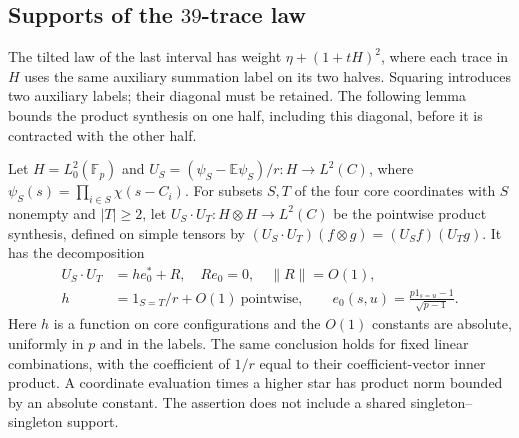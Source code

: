 \subsection{Supports of the \texorpdfstring{$39$}{39}-trace law}

The tilted law of the last interval has weight
$\eta+(1+tH)^2$, where each trace in $H$ uses the same auxiliary
summation label on its two halves. Squaring introduces two auxiliary
labels; their diagonal must be retained. The following lemma
bounds the product synthesis on one half, including this diagonal,
before it is contracted with the other half.
\begin{lemma}
\label{imp:local:star-product}
Let $H=L^2_0(\mathbb F_p)$ and
$U_S=(\psi_S-\mathbb E\psi_S)/r:H\to L^2(C)$, where
$\psi_S(s)=\prod_{i\in S}\chi(s-C_i)$.
For subsets $S,T$ of the four core coordinates with $S$ nonempty and
$|T|\ge2$, let $U_S\cdot U_T:H\otimes H\to L^2(C)$ be the
pointwise product synthesis, defined on simple tensors by
$(U_S\cdot U_T)(f\otimes g)=(U_Sf)(U_Tg)$.
It has the decomposition
\begin{equation}\label{eq:merge-local-I-4}
 \begin{aligned}
 U_S\cdot U_T&=h e_0^*+R,\quad Re_0=0,\quad \|R\|=O(1),\\
 h&=1_{S=T}/r+O(1)\ \text{pointwise},\qquad
 e_0(s,u)=\frac{p1_{s=u}-1}{\sqrt{p-1}}.
 \end{aligned}
\end{equation}
Here $h$ is a function on core configurations and the $O(1)$
constants are absolute, uniformly in $p$ and in the labels. The
same conclusion holds for fixed linear combinations, with the
coefficient of $1/r$ equal to their coefficient-vector inner product.
A coordinate evaluation times a higher star has product norm bounded by an absolute constant.
The assertion does not include a shared singleton--singleton support.
\end{lemma}


